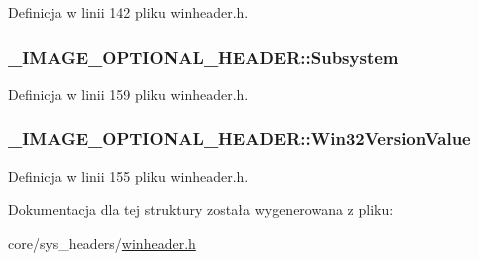 Definicja w linii 142 pliku winheader.\-h.

\hypertarget{struct___i_m_a_g_e___o_p_t_i_o_n_a_l___h_e_a_d_e_r_a6fcbb9f04ec9507241657a41c3ad26ac}{
\subsubsection[{Subsystem}]{ \-\_\-\-I\-M\-A\-G\-E\-\_\-\-O\-P\-T\-I\-O\-N\-A\-L\-\_\-\-H\-E\-A\-D\-E\-R\-::\-Subsystem}}\label{struct___i_m_a_g_e___o_p_t_i_o_n_a_l___h_e_a_d_e_r_a6fcbb9f04ec9507241657a41c3ad26ac}


Definicja w linii 159 pliku winheader.\-h.

\hypertarget{struct___i_m_a_g_e___o_p_t_i_o_n_a_l___h_e_a_d_e_r_a27fded2b959e7c04c028a84f301505bf}{
\subsubsection[{Win32\-Version\-Value}]{ \-\_\-\-I\-M\-A\-G\-E\-\_\-\-O\-P\-T\-I\-O\-N\-A\-L\-\_\-\-H\-E\-A\-D\-E\-R\-::\-Win32\-Version\-Value}}\label{struct___i_m_a_g_e___o_p_t_i_o_n_a_l___h_e_a_d_e_r_a27fded2b959e7c04c028a84f301505bf}


Definicja w linii 155 pliku winheader.\-h.



Dokumentacja dla tej struktury została wygenerowana z pliku\-:\begin{DoxyCompactItemize}
\item 
core/sys\-\_\-headers/\hyperlink{winheader_8h}{winheader.\-h}\end{DoxyCompactItemize}
